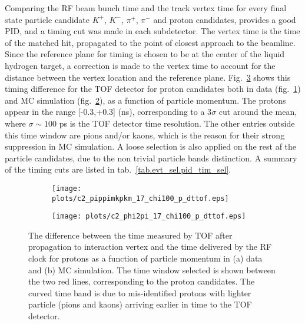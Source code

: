 Comparing the RF beam bunch time and the track vertex time for every final state particle candidate $K^{+}$, $K^{-}$, $\pi^{+}$, $\pi^{-}$ and proton candidates, provides a good PID, and a timing cut was made in each subdetector. The vertex time is the time of the matched hit, propagated to the point of closest approach to the beamline. Since the reference plane for timing is chosen to be at the center of the liquid hydrogen target, a correction is made to the vertex time to account for the distance between the vertex location and the reference plane. Fig.~\ref{fig.evt_sel.pid_tim_sel} shows this timing difference for the TOF detector for proton candidates both in data (fig.~\ref{fig.evt_sel.pid_tim_sel.a}) and MC simulation (fig.~\ref{fig.evt_sel.pid_tim_sel.b}), as a function of particle momentum. The protons appear in the range [-0.3,+0.3] (ns), corresponding to a 3$\sigma$ cut around the mean, where $\sigma \sim 100$ ps is the TOF detector time resolution. The other entries outside this time window are pions and/or kaons, which is the reason for their strong suppression in MC simulation. A loose selection is also applied on the rest af the particle candidates, due to the non trivial particle bands distinction. A summary of the timing cuts are listed in tab.~\ref{tab.evt_sel.pid_tim_sel}.

\begin{figure}[H]
    \centering
    \begin{subfigure}[b]{0.5\textwidth}
        \texttt{[image: plots/c2\_pippimkpkm\_17\_chi100\_p\_dttof.eps]}
        \caption{}
        \label{fig.evt_sel.pid_tim_sel.a}
    \end{subfigure}\hfill
    \begin{subfigure}[b]{0.5\textwidth}
        \texttt{[image: plots/c2\_phi2pi\_17\_chi100\_p\_dttof.eps]}
        \caption{}
        \label{fig.evt_sel.pid_tim_sel.b}
    \end{subfigure}
    \caption{The difference between the time measured by TOF after propagation to interaction vertex and the time delivered by the RF clock for protons as a function of particle momentum in (a) data and (b) MC simulation. The time window selected is shown between the two red lines, corresponding to the proton candidates. The curved time band is due to mis-identified protons with lighter particle (pions and kaons) arriving earlier in time to the TOF detector.}
    \label{fig.evt_sel.pid_tim_sel}
\end{figure}

